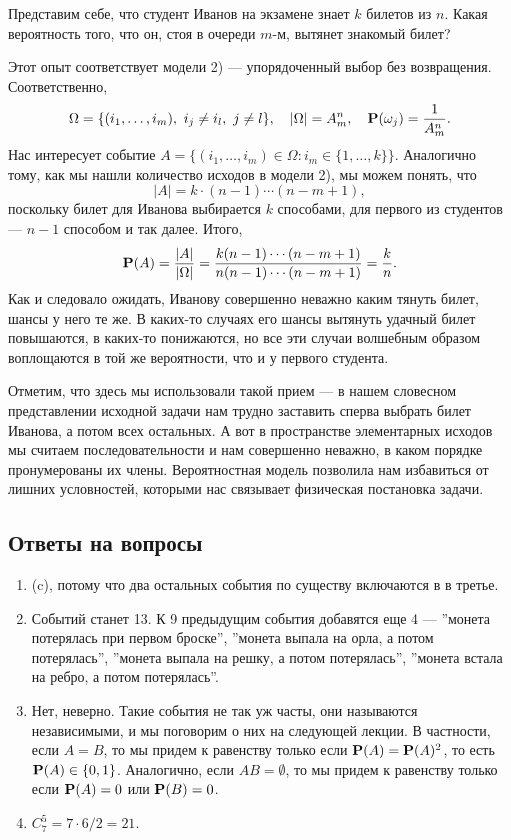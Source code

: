 \documentclass[11 pt,russian]{article}
\begin{document}
\begin{Exam}
Представим себе, что студент Иванов на экзамене знает $k$ билетов из $n$. Какая вероятность того, что он, стоя в очереди $m$-м, вытянет знакомый билет?

Этот опыт соответствует модели 2) --- упорядоченный выбор без возвращения. Соответственно, 
$$\Omega = \{(i_1,\dotsc,i_m),\ i_j\neq i_l,\ j\neq l\},\quad |\Omega|=A_m^n,\quad {\bf P}(\omega_j) = \frac{1}{A_m^n}.
$$
 Нас интересует событие $A=\{(i_1,\dotsc,i_m)\in \Omega: i_m \in \{1,\dotsc,k\}\}$. Аналогично тому, как мы нашли количество исходов в модели 2), мы можем понять, что 
 $$
 |A| = k\cdot (n-1) \dotsm (n-m+1), 
 $$
 поскольку билет для Иванова выбирается $k$ способами, для первого из студентов --- $n-1$ способом и так далее. Итого,
 $$
 {\bf P}(A) = \frac{|A|}{|\Omega|} = \frac{k(n-1)\dotsm(n-m+1)}{n(n-1)\dotsm(n-m+1)} = \frac kn.
 $$
 Как и следовало ожидать, Иванову совершенно неважно каким тянуть билет, шансы у него те же. В каких-то случаях его шансы вытянуть удачный билет повышаются, в каких-то понижаются, но все эти случаи волшебным образом воплощаются в той же вероятности, что и у первого студента.
 
Отметим, что здесь мы использовали такой прием --- в нашем словесном представлении исходной задачи нам трудно заставить сперва выбрать билет Иванова, а потом всех остальных. А вот в пространстве элементарных исходов мы считаем последовательности и нам совершенно неважно, в каком порядке пронумерованы их члены. Вероятностная модель позволила нам избавиться от лишних условностей, которыми нас связывает физическая постановка задачи.
\end{Exam}
\subsection{Ответы на вопросы}
\begin{enumerate}
\item (c), потому что два остальных события по существу включаются в в третье.
\item Событий станет 13. К 9 предыдущим события добавятся еще 4 --- ''монета потерялась при первом броске'', ''монета выпала на орла, а потом потерялась'', ''монета выпала на решку, а потом потерялась'', ''монета встала на ребро, а потом потерялась''.
\item Нет, неверно. Такие события не так уж часты, они называются независимыми, и мы поговорим о них на следующей лекции. В частности, если $A=B$, то мы придем к равенству только если ${\bf P}(A) = {\bf P}(A)^2$, то есть ${\bf P}(A)\in \{0,1\}$. Аналогично, если $AB=\emptyset$, то мы придем к равенству только если ${\bf P}(A)=0$ или ${\bf P}(B)=0$.
\item $C_7^5 = 7\cdot 6/2 = 21$.
\end{enumerate}
\end{document}
